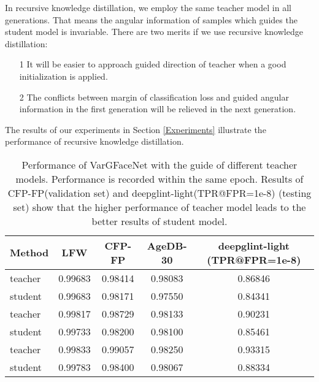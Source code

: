 \documentclass[10pt,twocolumn,letterpaper]{article}
\begin{document}
In recursive knowledge distillation, we employ the same teacher model in all generations. That means the angular information of samples which guides the student model is invariable. There are two merits if we use recursive knowledge distillation:

\begin{itemize}
	\item[1] It will be easier to approach guided direction of teacher when a good initialization is applied.
	\item[2] The conflicts between margin of classification loss and guided angular information in the first generation will be relieved in the next generation.
\end{itemize}

The results of our experiments in Section \ref{Experiments} illustrate the performance of recursive knowledge distillation.




\begin{table*}[htb]
	\begin{center}
		\setlength{\tabcolsep}{7mm}
		\begin{tabular}{l|c|c|c|c}
			\hline
			\hline
			Method &  LFW & CFP-FP & AgeDB-30 & deepglint-light (TPR@FPR=1e-8) \\
			\hline
			teacher &  0.99683 & 0.98414 & 0.98083 & 0.86846 \\
			student & 0.99683 & 0.98171 & 0.97550  & 0.84341 \\
			\hline
			teacher & 0.99817 & 0.98729 & 0.98133 & 0.90231 \\
			student & 0.99733 & 0.98200 & 0.98100 & 0.85461 \\
			\hline
			teacher & 0.99833 & 0.99057 & 0.98250 & 0.93315 \\
			student & 0.99783 & 0.98400 & 0.98067 & 0.88334 \\
			\hline
			\hline
		\end{tabular}
	\end{center}
	\caption{Performance of VarGFaceNet with the guide of different teacher models. Performance is recorded within the same epoch.  Results of CFP-FP(validation set) and deepglint-light(TPR@FPR=1e-8) (testing set) show that the higher performance of teacher model leads to the better results of student model.   }
	\label{kd}
\end{table*}
\end{document}
